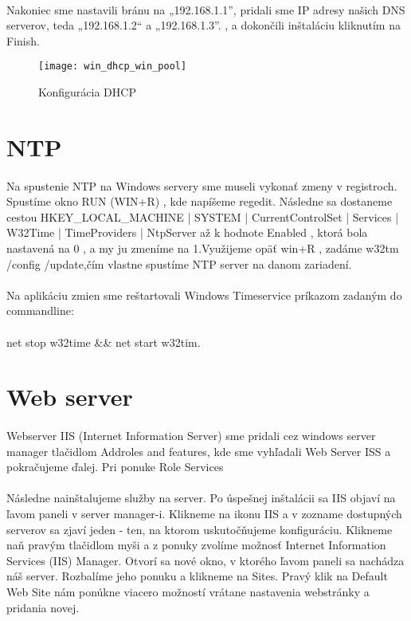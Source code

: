 \paragraph{}
Nakoniec sme nastavili bránu na „192.168.1.1”, pridali sme IP adresy našich DNS serverov, teda  „192.168.1.2“ a „192.168.1.3”. , a dokončili inštaláciu kliknutím na Finish.

\begin{figure}[!htb]
\centering
\texttt{[image: win\_dhcp\_win\_pool]}
\caption{Konfigurácia DHCP}
\label{fig:x win_dhcp_pool}
\end{figure}


\section{NTP}
\paragraph{}
Na spustenie NTP na Windows servery sme museli vykonať zmeny v registroch. Spustíme okno RUN  (WIN+R) , kde napíšeme regedit. Následne sa dostaneme cestou HKEY\_LOCAL\_MACHINE | SYSTEM | CurrentControlSet | Services | W32Time | TimeProviders | NtpServer	až k hodnote Enabled , ktorá bola nastavená na 0 , a my ju zmeníme na 1.Využijeme opäť win+R , zadáme w32tm /config /update,čím vlastne spustíme NTP server na danom zariadení.
\paragraph{}
Na aplikáciu  zmien sme reštartovali Windows Timeservice príkazom zadaným do commandline:
\\
\\
net stop w32time \&\& net start w32tim.

\section{Web server}
\paragraph{}
Webserver IIS (Internet Information Server) sme pridali cez windows server manager tlačidlom Addroles and features, kde sme vyhľadali Web Server ISS a pokračujeme ďalej. Pri ponuke Role Services
\paragraph{}
Následne nainštalujeme služby na server. Po úspešnej inštalácii sa IIS objaví na \v{l}avom paneli v server manager-i. Klikneme na ikonu IIS a v zozname dostupných serverov sa zjaví jeden - ten, na ktorom uskuto\v{c}\v{n}ujeme konfiguráciu. Klikneme na\v{n} pravým tla\v{c}idlom myši a z ponuky zvolíme možnos\v{t} Internet Information Services (IIS) Manager. Otvorí sa nové okno, v ktorého \v{l}avom paneli sa nachádza náš server. Rozbalíme jeho ponuku a klikneme na Sites. Pravý klik na Default Web Site nám ponúkne viacero možností vrátane nastavenia webstránky a pridania novej.

